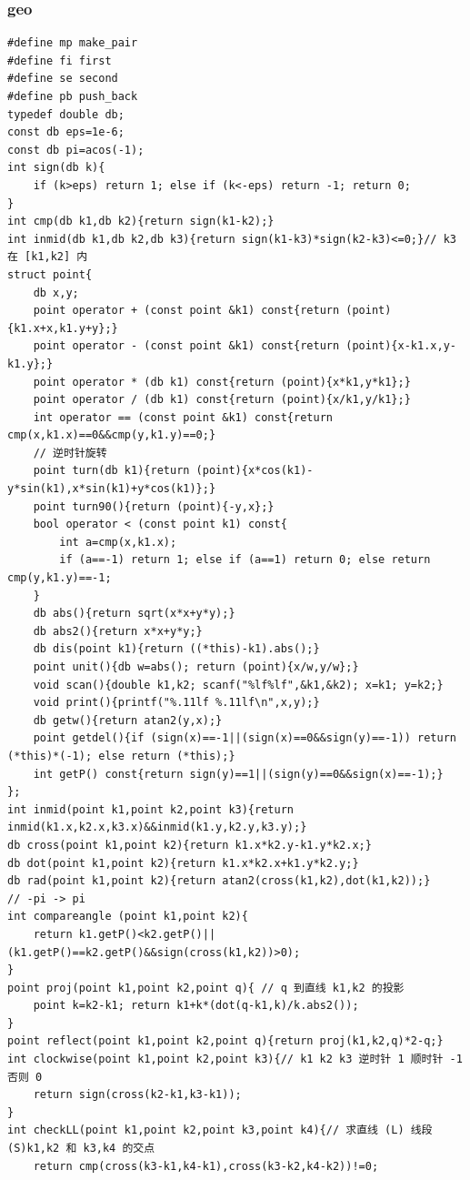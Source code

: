 \documentclass[twoside]{article}
\begin{document}
\subsubsection{geo}
\begin{lstlisting}
#define mp make_pair
#define fi first
#define se second
#define pb push_back
typedef double db;
const db eps=1e-6;
const db pi=acos(-1);
int sign(db k){
    if (k>eps) return 1; else if (k<-eps) return -1; return 0;
}
int cmp(db k1,db k2){return sign(k1-k2);}
int inmid(db k1,db k2,db k3){return sign(k1-k3)*sign(k2-k3)<=0;}// k3 在 [k1,k2] 内 
struct point{
    db x,y;
    point operator + (const point &k1) const{return (point){k1.x+x,k1.y+y};}
    point operator - (const point &k1) const{return (point){x-k1.x,y-k1.y};}
    point operator * (db k1) const{return (point){x*k1,y*k1};}
    point operator / (db k1) const{return (point){x/k1,y/k1};}
    int operator == (const point &k1) const{return cmp(x,k1.x)==0&&cmp(y,k1.y)==0;}
    // 逆时针旋转 
    point turn(db k1){return (point){x*cos(k1)-y*sin(k1),x*sin(k1)+y*cos(k1)};}
    point turn90(){return (point){-y,x};}
    bool operator < (const point k1) const{
        int a=cmp(x,k1.x);
        if (a==-1) return 1; else if (a==1) return 0; else return cmp(y,k1.y)==-1;
    }
    db abs(){return sqrt(x*x+y*y);}
    db abs2(){return x*x+y*y;}
    db dis(point k1){return ((*this)-k1).abs();}
    point unit(){db w=abs(); return (point){x/w,y/w};}
    void scan(){double k1,k2; scanf("%lf%lf",&k1,&k2); x=k1; y=k2;}
    void print(){printf("%.11lf %.11lf\n",x,y);}
    db getw(){return atan2(y,x);} 
    point getdel(){if (sign(x)==-1||(sign(x)==0&&sign(y)==-1)) return (*this)*(-1); else return (*this);}
	int getP() const{return sign(y)==1||(sign(y)==0&&sign(x)==-1);}
};
int inmid(point k1,point k2,point k3){return inmid(k1.x,k2.x,k3.x)&&inmid(k1.y,k2.y,k3.y);}
db cross(point k1,point k2){return k1.x*k2.y-k1.y*k2.x;}
db dot(point k1,point k2){return k1.x*k2.x+k1.y*k2.y;}
db rad(point k1,point k2){return atan2(cross(k1,k2),dot(k1,k2));}
// -pi -> pi
int compareangle (point k1,point k2){
    return k1.getP()<k2.getP()||(k1.getP()==k2.getP()&&sign(cross(k1,k2))>0);
}
point proj(point k1,point k2,point q){ // q 到直线 k1,k2 的投影 
    point k=k2-k1; return k1+k*(dot(q-k1,k)/k.abs2());
}
point reflect(point k1,point k2,point q){return proj(k1,k2,q)*2-q;}
int clockwise(point k1,point k2,point k3){// k1 k2 k3 逆时针 1 顺时针 -1 否则 0  
    return sign(cross(k2-k1,k3-k1));
}
int checkLL(point k1,point k2,point k3,point k4){// 求直线 (L) 线段 (S)k1,k2 和 k3,k4 的交点 
    return cmp(cross(k3-k1,k4-k1),cross(k3-k2,k4-k2))!=0;

\end{lstlisting}
\end{document}
